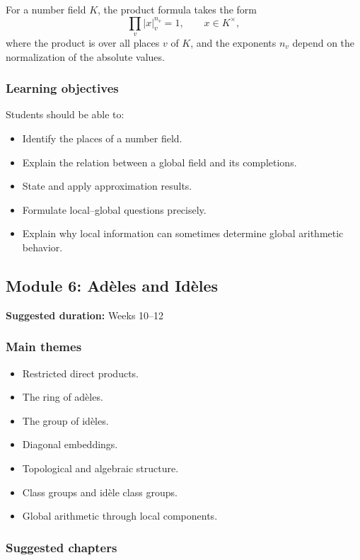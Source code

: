 \documentclass[11pt]{article}
\begin{document}
For a number field \(K\), the product formula takes the form
\[
    \prod_v |x|_v^{n_v}=1,
    \qquad x\in K^\times,
\]
where the product is over all places \(v\) of \(K\), and the exponents
\(n_v\) depend on the normalization of the absolute values.

\subsubsection*{Learning objectives}

Students should be able to:

\begin{itemize}
    \item Identify the places of a number field.
    \item Explain the relation between a global field and its completions.
    \item State and apply approximation results.
    \item Formulate local--global questions precisely.
    \item Explain why local information can sometimes determine global
          arithmetic behavior.
\end{itemize}

\subsection{Module 6: Adèles and Idèles}

\textbf{Suggested duration:} Weeks 10--12

\subsubsection*{Main themes}

\begin{itemize}
    \item Restricted direct products.
    \item The ring of adèles.
    \item The group of idèles.
    \item Diagonal embeddings.
    \item Topological and algebraic structure.
    \item Class groups and idèle class groups.
    \item Global arithmetic through local components.
\end{itemize}

\subsubsection*{Suggested chapters}
\end{document}
